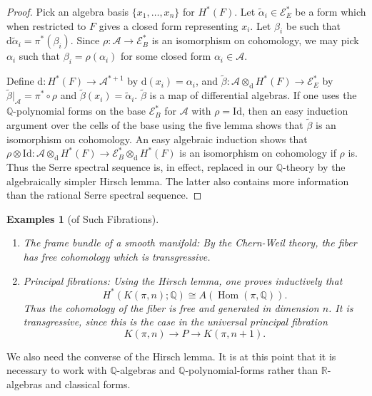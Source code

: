 \documentclass[11pt]{amsart}
\theoremstyle{plain}
\newtheorem{examples}[theorem]{Examples}
\theoremstyle{definition}
\DeclareMathOperator{\Hom}{Hom}
\newcommand{\sA}{\mathscr{A}}
\newcommand{\sE}{\mathscr{E}}
\newcommand{\dd}{\mathrm{d}}
\newcommand{\RR}{\mathbb{R}}
\newcommand{\QQ}{\mathbb{Q}}
\newcommand{\Id}{\mathrm{Id}}
\begin{document}
\begin{proof}
Pick an algebra basis $\{x_{1}, \ldots, x_{n}\}$ for $H^{*}(F)$. Let $\tilde{\alpha}_{i} \in \sE^{*}_{E}$ be a form which when restricted to $F$ gives a closed form representing $x_{i}$. Let $\beta_{i}$ be such that $\dd\tilde{\alpha}_{i} = \pi^{*}(\beta_{i})$. Since $\rho \colon \sA \to \sE^{*}_{B}$ is an isomorphism on cohomology, we may pick $\alpha_{i}$ such that $\beta_{i} = \rho(\alpha_{i})$ for some closed form $\alpha_{i} \in \sA$.

Define $\dd \colon H^{*}(F) \to \sA^{*+1}$ by $\dd(x_{i}) = \alpha_{i}$, and $\tilde{\beta} \colon \sA \otimes_{\dd} H^{*}(F) \to \sE^{*}_{E}$ by $\tilde{\beta}|_{\sA} = \pi^{*} \circ \rho$ and $\tilde{\beta}(x_{i}) = \tilde{\alpha}_{i}$. $\tilde{\beta}$ is a map of differential algebras. If one uses the $\QQ$-polynomial forms on the base $\sE^{*}_{B}$ for $\sA$ with $\rho = \Id$, then an easy induction argument over the cells of the base using the five lemma shows that $\tilde{\beta}$ is an isomorphism on cohomology. An easy algebraic induction shows that $\rho \otimes \Id \colon \sA \otimes_{\dd} H^{*}(F) \to \sE^{*}_{B} \otimes_{\dd} H^{*}(F)$ is an isomorphism on cohomology if $\rho$ is. Thus the Serre spectral sequence is, in effect, replaced in our $\QQ$-theory by the algebraically simpler Hirsch lemma. The latter also contains more information than the rational Serre spectral sequence.
\end{proof}

\begin{examples}[of Such Fibrations]
\begin{enumerate}
\item[1)] \emph{The frame bundle of a smooth manifold:} By the Chern-Weil theory, the fiber has free cohomology which is transgressive.
\item[2)] \emph{Principal fibrations:} Using the Hirsch lemma, one proves inductively that
\[
H^{*}(K(\pi, n); \QQ) \cong A(\Hom(\pi, \QQ)).
\]
Thus the cohomology of the fiber is free and generated in dimension $n$. It is transgressive, since this is the case in the universal principal fibration
\[
K(\pi, n) \longrightarrow P \longrightarrow K(\pi, n+1).
\]
\end{enumerate}
\end{examples}

We also need the converse of the Hirsch lemma. It is at this point that it is necessary to work with $\QQ$-algebras and $\QQ$-polynomial-forms rather than $\RR$-algebras and classical forms.
\end{document}
